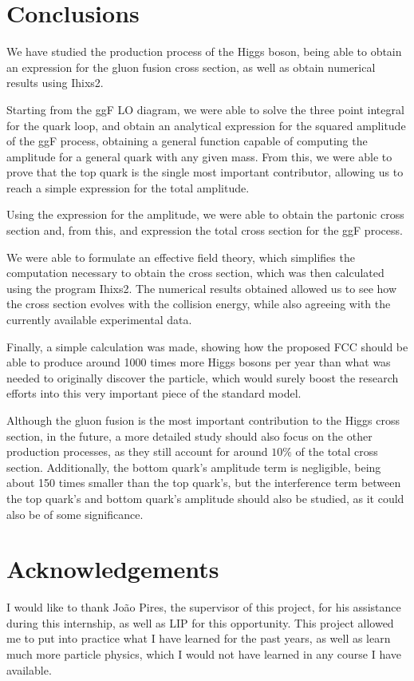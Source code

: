 \documentclass[EPJ,twocolumn]{webofc}
\begin{document}
\section{\label{sec5}Conclusions}

We have studied the production process of the Higgs boson, being able to obtain an expression for the gluon fusion cross section, as well as obtain numerical results using Ihixs2.

Starting from the ggF LO diagram, we were able to solve the three point integral for the quark loop, and obtain an analytical expression for the squared amplitude of the ggF process, obtaining a general function capable of computing the amplitude for a general quark with any given mass. From this, we were able to prove that the top quark is the single most important contributor, allowing us to reach a simple expression for the total amplitude.

Using the expression for the amplitude, we were able to obtain the partonic cross section and, from this, and expression the total cross section for the ggF process.

We were able to formulate an effective field theory, which simplifies the computation necessary to obtain the cross section, which was then calculated using the program Ihixs2. The numerical results obtained allowed us to see how the cross section evolves with the collision energy, while also agreeing with the currently available experimental data.

Finally, a simple calculation was made, showing how the proposed FCC should be able to produce around 1000 times more Higgs bosons per year than what was needed to originally discover the particle, which would surely boost the research efforts into this very important piece of the standard model.

Although the gluon fusion is the most important contribution to the Higgs cross section, in the future, a more detailed study should also focus on the other production processes, as they still account for around $10\%$ of the total cross section. Additionally, the bottom quark's amplitude term is negligible, being about 150 times smaller than the top quark's, but the interference term between the top quark's and bottom quark's amplitude should also be studied, as it could also be of some significance.


\section*{Acknowledgements}
I would like to thank João Pires, the supervisor of this project, for his assistance during this internship, as well as LIP for this opportunity. This project allowed me to put into practice what I have learned for the past years, as well as learn much more particle physics, which I would not have learned in any course I have available.


\appendix 





\end{document}
